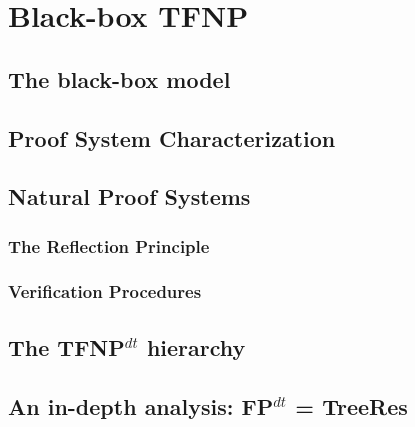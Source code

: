 \hypersetup{colorlinks=true, linkcolor=blue, citecolor=red}

\chapter{Black-box TFNP} \label{chap:bb-tfnp}

\section{The black-box model}

\section{Proof System Characterization}

\section{Natural Proof Systems}

\subsection{The Reflection Principle}

\subsection{Verification Procedures}

\section{The TFNP$^{dt}$ hierarchy}

\section{An in-depth analysis: FP$^{dt}$ = TreeRes}

\cleardoublepage